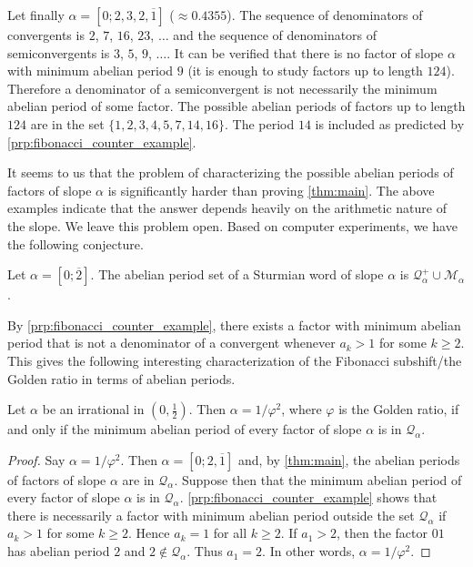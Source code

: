 \documentclass[a4paper,fleqn]{article}
\newcommand{\qk}[1]{\mathcal{Q}_{#1}}
\newcommand{\qkl}[1]{\mathcal{Q}^+_{#1}}
\begin{document}
  Let finally $\alpha = [0; 2, 3, 2, \overline{1}]$ ($\approx 0.4355$). The sequence of denominators of convergents is
  $2$, $7$, $16$, $23$, $\ldots$ and the sequence of denominators of semiconvergents is $3$, $5$, $9$, $\ldots$. It can
  be verified that there is no factor of slope $\alpha$ with minimum abelian period $9$ (it is enough to study factors
  up to length $124$). Therefore a denominator of a semiconvergent is not necessarily the minimum abelian period of
  some factor. The possible abelian periods of factors up to length $124$ are in the set
  $\{1, 2, 3, 4, 5, 7, 14, 16\}$. The period $14$ is included as predicted by \autoref{prp:fibonacci_counter_example}.

  It seems to us that the problem of characterizing the possible abelian periods of factors of slope $\alpha$ is
  significantly harder than proving \autoref{thm:main}. The above examples indicate that the answer depends heavily on
  the arithmetic nature of the slope. We leave this problem open. Based on computer experiments, we have the following
  conjecture.

  \begin{conjecture}
    Let $\alpha = [0; \overline{2}]$. The abelian period set of a Sturmian word of slope $\alpha$ is
    $\qkl{\alpha} \cup \mathcal{M}_\alpha$.
  \end{conjecture}

  By \autoref{prp:fibonacci_counter_example}, there exists a factor with minimum abelian period that is not a
  denominator of a convergent whenever $a_k > 1$ for some $k \geq 2$. This gives the following interesting
  characterization of the Fibonacci subshift/the Golden ratio in terms of abelian periods.

  \begin{theorem}\label{thm:fibonacci_characterization}
    Let $\alpha$ be an irrational in $(0, \tfrac12)$. Then $\alpha = 1/\varphi^2$, where $\varphi$ is the Golden ratio,
    if and only if the minimum abelian period of every factor of slope $\alpha$ is in $\qk{\alpha}$.
  \end{theorem}
  \begin{proof}
    Say $\alpha = 1/\varphi^2$. Then $\alpha = [0; 2, \overline{1}]$ and, by \autoref{thm:main}, the abelian periods of
    factors of slope $\alpha$ are in $\qk{\alpha}$. Suppose then that the minimum abelian period of every factor of
    slope $\alpha$ is in $\qk{\alpha}$. \autoref{prp:fibonacci_counter_example} shows that there is necessarily a
    factor with minimum abelian period outside the set $\qk{\alpha}$ if $a_k > 1$ for some $k \geq 2$. Hence $a_k = 1$
    for all $k \geq 2$. If $a_1 > 2$, then the factor $01$ has abelian period $2$ and $2 \notin \qk{\alpha}$. Thus
    $a_1 = 2$. In other words, $\alpha = 1/\varphi^2$.
  \end{proof}
\end{document}
